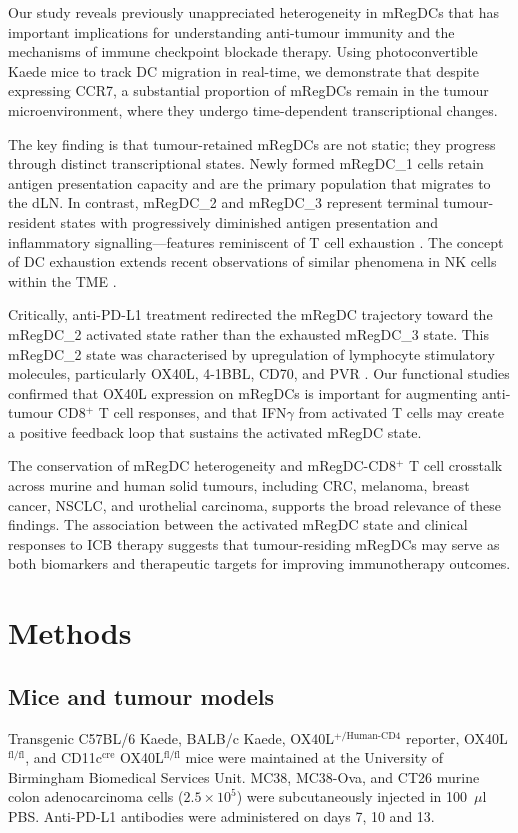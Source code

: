 \documentclass[11pt]{article}
\begin{document}
Our study reveals previously unappreciated heterogeneity in mRegDCs that has important implications for understanding anti-tumour immunity and the mechanisms of immune checkpoint blockade therapy. Using photoconvertible Kaede mice to track DC migration in real-time, we demonstrate that despite expressing CCR7, a substantial proportion of mRegDCs remain in the tumour microenvironment, where they undergo time-dependent transcriptional changes.

The key finding is that tumour-retained mRegDCs are not static; they progress through distinct transcriptional states. Newly formed mRegDC\_1 cells retain antigen presentation capacity and are the primary population that migrates to the dLN. In contrast, mRegDC\_2 and mRegDC\_3 represent terminal tumour-resident states with progressively diminished antigen presentation and inflammatory signalling---features reminiscent of T cell exhaustion \citep{wherry2011}. The concept of DC exhaustion extends recent observations of similar phenomena in NK cells within the TME \citep{galvez2023}.

Critically, anti-PD-L1 treatment redirected the mRegDC trajectory toward the mRegDC\_2 activated state rather than the exhausted mRegDC\_3 state. This mRegDC\_2 state was characterised by upregulation of lymphocyte stimulatory molecules, particularly OX40L, 4-1BBL, CD70, and PVR \citep{croft2009}. Our functional studies confirmed that OX40L expression on mRegDCs is important for augmenting anti-tumour CD8$^+$ T cell responses, and that IFN$\gamma$ from activated T cells may create a positive feedback loop that sustains the activated mRegDC state.

The conservation of mRegDC heterogeneity and mRegDC-CD8$^+$ T cell crosstalk across murine and human solid tumours, including CRC, melanoma, breast cancer, NSCLC, and urothelial carcinoma, supports the broad relevance of these findings. The association between the activated mRegDC state and clinical responses to ICB therapy suggests that tumour-residing mRegDCs may serve as both biomarkers and therapeutic targets for improving immunotherapy outcomes.

\section{Methods}

\subsection{Mice and tumour models}
Transgenic C57BL/6 Kaede, BALB/c Kaede, OX40L$^{+/\text{Human-CD4}}$ reporter, OX40L$^{\text{fl/fl}}$, and CD11c$^{\text{cre}}$ OX40L$^{\text{fl/fl}}$ mice were maintained at the University of Birmingham Biomedical Services Unit. MC38, MC38-Ova, and CT26 murine colon adenocarcinoma cells ($2.5 \times 10^5$) were subcutaneously injected in 100~$\mu$l PBS. Anti-PD-L1 antibodies were administered on days 7, 10 and 13.
\end{document}
